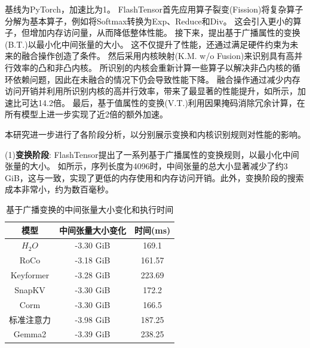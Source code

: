 基线为PyTorch，加速比为1。
FlashTensor首先应用算子裂变(Fission)将复杂算子分解为基本算子，例如将{Softmax}转换为{Exp}、{Reduce}和{Div}。
这会引入更小的算子，但增加内存访问量，从而降低整体性能。
接下来，提出基于广播属性的变换(B.T.)以最小化中间张量的大小。
这不仅提升了性能，还通过满足硬件约束为未来的融合操作创造了条件。
然后采用内核映射(K.M. w/o Fusion)来识别具有高并行效率的凸和非凸内核。
所识别的内核会重新计算一些算子以解决非凸内核的循环依赖问题，因此在未融合的情况下仍会导致性能下降。
融合操作通过减少内存访问开销并利用所识别内核的高并行效率，带来了最显著的性能提升，如所示，加速比可达14.2倍。
最后，基于值属性的变换(V.T.)利用因果掩码消除冗余计算，在所有模型上进一步实现了近2倍的额外加速。



本研究进一步进行了各阶段分析，以分别展示变换和内核识别规则对性能的影响。

(1)\textbf{变换阶段}:
FlashTensor提出了一系列基于广播属性的变换规则，以最小化中间张量的大小。
如所示，序列长度为4096时，中间张量的总大小显著减少了约3 GiB，这与一致，实现了更低的内存使用和内存访问开销。此外，变换阶段的搜索成本非常小，约为数百毫秒。


\begin{table}[ht]
    \centering
    \caption{基于广播变换的中间张量大小变化和执行时间}
    \begin{tabular}{ccc}
       \toprule
       模型  & 中间张量大小变化 & 时间(ms) \\
       \hline
       \(H_{2}O\)  & -3.30 GiB & 169.1 \\
       RoCo  & -3.18 GiB & 161.57 \\
       Keyformer  & -3.28 GiB & 223.69 \\
       SnapKV  & -3.30 GiB & 172.2 \\
       Corm  & -3.30 GiB & 166.5 \\
       标准注意力  & -3.98 GiB & 187.25 \\
       Gemma2  & -3.39 GiB & 238.25 \\
       \bottomrule
    \end{tabular}
    \label{tab:transform}
\end{table}




